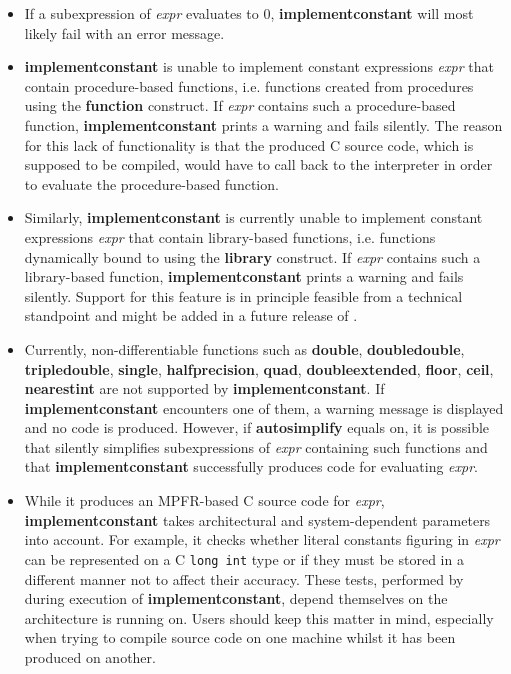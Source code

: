 \begin{itemize}
\item If a subexpression of \emph{expr} evaluates to $0$, \textbf{implementconstant} will most
   likely fail with an error message.

\item \textbf{implementconstant} is unable to implement constant expressions \emph{expr} that
   contain procedure-based functions, i.e. functions created from \sollya
   procedures using the \textbf{function} construct. If \emph{expr} contains such a
   procedure-based function, \textbf{implementconstant} prints a warning and fails
   silently. The reason for this lack of functionality is that the
   produced C source code, which is supposed to be compiled, would have
   to call back to the \sollya interpreter in order to evaluate the
   procedure-based function.

\item Similarly, \textbf{implementconstant} is currently unable to implement constant
   expressions \emph{expr} that contain library-based functions, i.e.
   functions dynamically bound to \sollya using the \textbf{library} construct.
   If \emph{expr} contains such a library-based function, \textbf{implementconstant} prints
   a warning and fails silently. Support for this feature is in principle
   feasible from a technical standpoint and might be added in a future
   release of \sollya.

\item Currently, non-differentiable functions such as \textbf{double}, \textbf{doubledouble},
   \textbf{tripledouble}, \textbf{single}, \textbf{halfprecision}, \textbf{quad}, \textbf{doubleextended}, 
   \textbf{floor}, \textbf{ceil}, \textbf{nearestint} are not supported by \textbf{implementconstant}. 
   If \textbf{implementconstant} encounters one of them, a warning message is displayed 
   and no code is produced. However, if \textbf{autosimplify} equals on, it is 
   possible that \sollya silently simplifies subexpressions of \emph{expr} 
   containing such functions and that \textbf{implementconstant} successfully produces 
   code for evaluating \emph{expr}.

\item While it produces an MPFR-based C source code for \emph{expr}, \textbf{implementconstant}
   takes architectural and system-dependent parameters into account.  For
   example, it checks whether literal constants figuring in \emph{expr} can be
   represented on a C \texttt{long int} type or if they must
   be stored in a different manner not to affect their accuracy. These
   tests, performed by \sollya during execution of \textbf{implementconstant}, depend
   themselves on the architecture \sollya is running on. Users should
   keep this matter in mind, especially when trying to compile source
   code on one machine whilst it has been produced on another.
\end{itemize}
